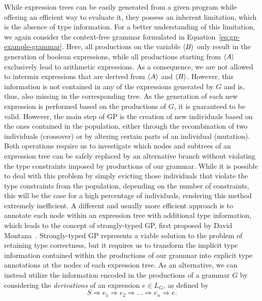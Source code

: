 While expression trees can be easily generated from a given program while offering an efficient way to evaluate it, they possess an inherent limitation, which is the absence of type information.
For a better understanding of this limitation, we again consider the context-free grammar formulated in Equation~\eqref{eq:gp-example-grammar}.
Here, all productions on the variable $\langle B \rangle$ only result in the generation of boolean expressions, while all productions starting from $\langle A \rangle$ exclusively lead to arithmetic expressions.
As a consequence, we are not allowed to intermix expressions that are derived from $\langle A \rangle$ and $\langle B \rangle$.
However, this information is not contained in any of the expressions generated by $G$ and is, thus, also missing in the corresponding tree.
As the generation of each new expression is performed based on the productions of $G$, it is guaranteed to be valid.
However, the main step of GP is the creation of new individuals based on the ones contained in the population, either through the recombination of two individuals (crossover) or by altering certain parts of an individual (mutation). 
Both operations require us to investigate which nodes and subtrees of an expression tree can be safely replaced by an alternative branch without violating the type constraints imposed by productions of our grammar.
While it is possible to deal with this problem by simply evicting those individuals that violate the type constraints from the population, depending on the number of constraints, this will be the case for a high percentage of individuals, rendering this method extremely inefficient.
A different and usually more efficient approach is to annotate each node within an expression tree with additional type information, which leads to the concept of strongly-typed GP, first proposed by David Montana~\cite{montana1995strongly}.
Strongly-typed GP represents a viable solution to the problem of retaining type correctness, but it requires us to transform the implicit type information contained within the productions of our grammar into explicit type annotations at the nodes of each expression tree.
As an alternative, we can instead utilize the information encoded in the productions of a grammar $G$ by considering the \emph{derivations} of an expression $e \in L_G$, as defined by
\begin{equation}
	S \Rightarrow e_1 \Rightarrow e_2 \Rightarrow \dots \Rightarrow e_n \Rightarrow e.
\end{equation}
